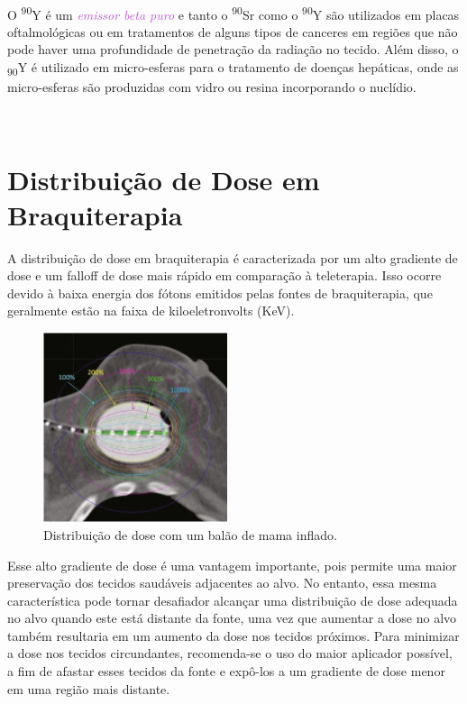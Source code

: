 \documentclass[11pt,a4paper]{article}
\begin{document}
		\

			O \textsuperscript{90}Y é um \textit{\textcolor{MediumOrchid}{emissor beta puro}} e tanto o \textsuperscript{90}Sr como o \textsuperscript{90}Y são utilizados em placas oftalmológicas ou em tratamentos de alguns tipos de canceres em regiões que não pode haver uma profundidade de penetração da radiação no tecido. Além disso, o \textsubscript{90}Y é utilizado em micro-esferas para o tratamento de doenças hepáticas, onde as micro-esferas são produzidas com vidro ou resina incorporando o nuclídio.

		\

\section{Distribuição de Dose em Braquiterapia}

	A distribuição de dose em braquiterapia é caracterizada por um alto gradiente de dose e um falloff de dose mais rápido em comparação à teleterapia. Isso ocorre devido à baixa energia dos fótons emitidos pelas fontes de braquiterapia, que geralmente estão na faixa de kiloeletronvolts (KeV).

	\begin{figure}
		\centering
		\includegraphics[width=0.48\textwidth]{Imagens/falloffDoseMammosite.JPG}
		\caption{Distribuição de dose com um balão de mama inflado.}
		\label{img:DistribuicaoDoseBalao}
	\end{figure}

	Esse alto gradiente de dose é uma vantagem importante, pois permite uma maior preservação dos tecidos saudáveis adjacentes ao alvo. No entanto, essa mesma característica pode tornar desafiador alcançar uma distribuição de dose adequada no alvo quando este está distante da fonte, uma vez que aumentar a dose no alvo também resultaria em um aumento da dose nos tecidos próximos. Para minimizar a dose nos tecidos circundantes, recomenda-se o uso do maior aplicador possível, a fim de afastar esses tecidos da fonte e expô-los a um gradiente de dose menor em uma região mais distante.
	
\end{document}
